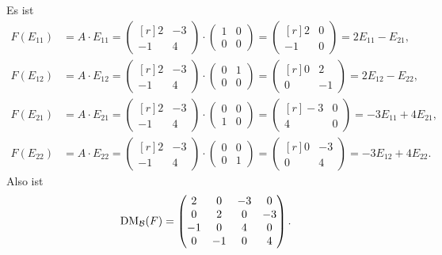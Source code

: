 \begin{solution}
 Es ist
 \begin{align*}
  F(E_{11})
  &= A \cdot E_{11}
  = \begin{pmatrix*}[r] 2 & -3 \\ -1 & 4 \end{pmatrix*} \cdot \begin{pmatrix} 1 & 0 \\ 0 & 0 \end{pmatrix}
  = \begin{pmatrix*}[r] 2 & 0 \\ -1 & 0 \end{pmatrix*} = 2 E_{11} - E_{21}, \\
  F(E_{12})
  &= A \cdot E_{12}
  = \begin{pmatrix*}[r] 2 & -3 \\ -1 & 4 \end{pmatrix*} \cdot \begin{pmatrix} 0 & 1 \\ 0 & 0 \end{pmatrix}
  = \begin{pmatrix*}[r] 0 & 2 \\ 0 & -1 \end{pmatrix*} = 2 E_{12} - E_{22}, \\
  F(E_{21})
  &= A \cdot E_{21}
  = \begin{pmatrix*}[r] 2 & -3 \\ -1 & 4 \end{pmatrix*} \cdot \begin{pmatrix} 0 & 0 \\ 1 & 0 \end{pmatrix}
  = \begin{pmatrix*}[r] -3 & 0 \\ 4 & 0 \end{pmatrix*} = -3 E_{11} + 4E_{21}, \\
  F(E_{22})
  &= A \cdot E_{22}
  = \begin{pmatrix*}[r] 2 & -3 \\ -1 & 4 \end{pmatrix*} \cdot \begin{pmatrix} 0 & 0 \\ 0 & 1 \end{pmatrix}
  = \begin{pmatrix*}[r] 0 & -3 \\ 0 & 4 \end{pmatrix*} = -3 E_{12} + 4E_{22}.
 \end{align*}
 Also ist
 \[
  \operatorname{DM}_{\mathcal{B}}(F) =
  \begin{pmatrix}
    2 &  0 & -3 &  0 \\
    0 &  2 &  0 & -3 \\
   -1 &  0 &  4 &  0 \\
    0 & -1 &  0 &  4
  \end{pmatrix}.
 \]
\end{solution}


